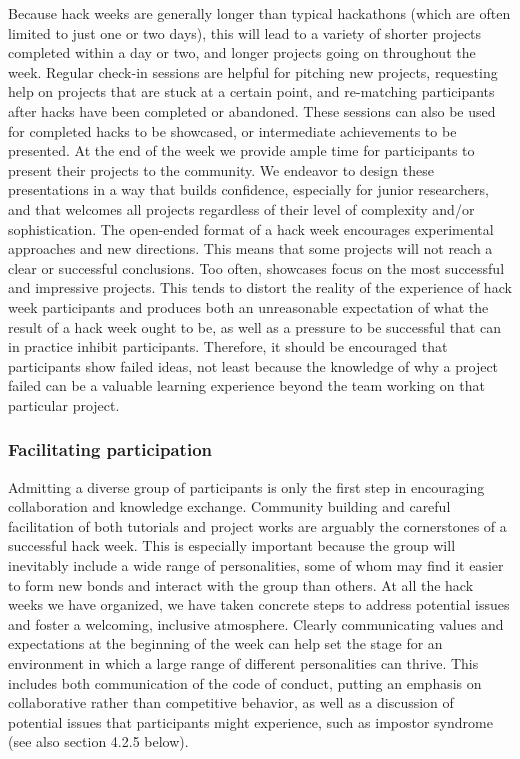 \documentclass{aastex62}
\begin{document}
Because hack weeks are generally longer than typical hackathons (which are often limited to just one or two days), this will lead to a variety of shorter projects completed within a day or two, and longer projects going on throughout the week. Regular check-in sessions are helpful for pitching new projects, requesting help on projects that are stuck at a certain point, and re-matching participants after hacks have been completed or abandoned. These sessions can also be used for completed hacks to be showcased, or intermediate achievements to be presented. At the end of the week we provide ample time for participants to present their projects to the community. We endeavor to design these presentations in a way that builds confidence, especially for junior researchers, and that welcomes all projects regardless of their level of complexity and/or sophistication. The open-ended format of a hack week encourages experimental approaches and new directions. This means that some projects will not reach a clear or successful conclusions. Too often, showcases focus on the most successful and impressive projects. This tends to distort the reality of the experience of hack week participants and produces both an unreasonable expectation of what the result of a hack week ought to be, as well as a pressure to be successful that can in practice inhibit participants. Therefore, it should be encouraged that participants show failed ideas, not least because the knowledge of why a project failed can be a valuable learning experience beyond the team working on that particular project.

\subsubsection{Facilitating participation}

Admitting a diverse group of participants is only the first step in encouraging collaboration and knowledge exchange. Community building and careful facilitation of both tutorials and project works are arguably the cornerstones of a successful hack week. This is especially important because the group will inevitably include a wide range of personalities, some of whom may find it easier to form new bonds and interact with the group than others. At all the hack weeks we have organized, we have taken concrete steps to address potential issues and foster a welcoming, inclusive atmosphere. Clearly communicating values and expectations at the beginning of the week can help set the stage for an environment in which a large range of different personalities can thrive. This includes both communication of the code of conduct, putting an emphasis on collaborative rather than competitive behavior, as well as a discussion of potential issues that participants might experience, such as impostor syndrome (see also  section 4.2.5 below).
\end{document}
